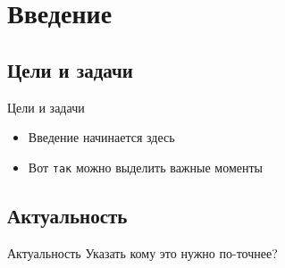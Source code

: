 \section{Введение}

\subsection{Цели и задачи}
\begin{frame}{Цели и задачи}
	\begin{itemize}
	 \item Введение начинается здесь
	 \item Вот \texttt{так} можно выделить важные моменты
	\end{itemize}
\end{frame}

\subsection{Актуальность}
\begin{frame}{Актуальность}
	Указать кому это нужно по-точнее?
\end{frame}
